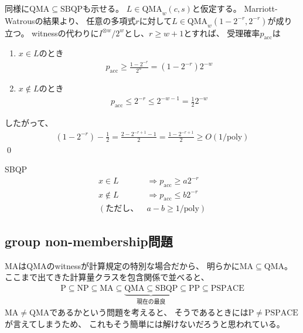 \documentclass[a4paper, 10pt]{jsarticle}
\begin{document}
同様に$\mathrm{QMA} \subseteq \mathrm{SBQP}$も示せる。
$L \in \mathrm{QMA}_w (c, s)$と仮定する。
Marriott-Watrousの結果より、
任意の多項式$r$に対して$L \in \mathrm{QMA}_w (1-2^{-r}, 2^{-r})$が成り立つ。
witnessの代わりに$I^{\otimes w}/2^{w}$とし、$r \geq w + 1$とすれば、
受理確率$p_{\mathrm{acc}}$は
\begin{multicols}{2}
	\begin{enumerate}
		\item $x \in L$のとき
		\begin{align}
			p_{\mathrm{acc}} \geq \frac{1 - 2^{-r}}{2^w}
			= \left( 1 - 2^{-r} \right) 2^{-w}
		\end{align}
		\item $x \notin L$のとき
		\begin{align}
			p_{\mathrm{acc}} \leq 2^{-r} \leq 2^{-w-1} = \frac{1}{2} 2^{-w}
		\end{align}
	\end{enumerate}
	したがって、
	\begin{align}
		\left( 1 - 2^{-r} \right) - \frac{1}{2}
		= \frac{2 - 2^{-r+1} - 1}{2}
		= \frac{1 - 2^{-r+1}}{2}
		\geq O(1/\mathrm{poly})
	\end{align}
	\qed
	\columnbreak
	\begin{itembox}[l]{SBQP}
		\vspace{-1zh}
		\begin{align}
			x \in L &\Rightarrow p_\mathrm{acc} \geq a 2^{-r} \\
			x \notin L &\Rightarrow p_\mathrm{acc} \leq b 2^{-r} \\
			\left( \text{ただし、} \right. \
			&\left. a - b \geq 1/\mathrm{poly} \right)
		\end{align}
	\end{itembox}
\end{multicols}

\subsection{group non-membership問題}
MAはQMAのwitnessが計算規定の特別な場合だから、
明らかに$\mathrm{MA} \subseteq \mathrm{QMA}$。
ここまで出てきた計算量クラスを包含関係で並べると、
\begin{align}
	\mathrm{P} \subseteq \mathrm{NP} \subseteq \mathrm{MA} \subseteq
	\underbrace{\mathrm{QMA} \subseteq \mathrm{SBQP}}_{
		\mathrm{現在の最良}
	} \subseteq \mathrm{PP} \subseteq \mathrm{PSPACE}
\end{align}
$\mathrm{MA} \neq \mathrm{QMA}$であるかという問題を考えると、
そうであるときには$\mathrm{P} \neq \mathrm{PSPACE}$が言えてしまうため、
これもそう簡単には解けないだろうと思われている。
\end{document}
